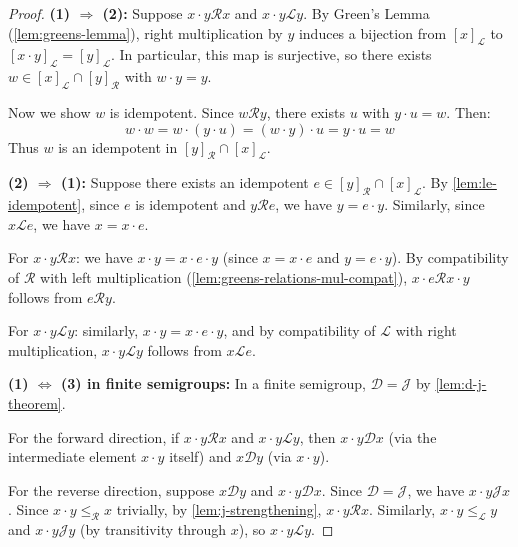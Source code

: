 \begin{proof}
\leanok
\textbf{(1) $\Rightarrow$ (2):} Suppose $x \cdot y \mathcal{R} x$ and $x \cdot y \mathcal{L} y$. By Green's Lemma (\ref{lem:greens-lemma}), right multiplication by $y$ induces a bijection from $[x]_{\mathcal{L}}$ to $[x \cdot y]_{\mathcal{L}} = [y]_{\mathcal{L}}$. In particular, this map is surjective, so there exists $w \in [x]_{\mathcal{L}} \cap [y]_{\mathcal{R}}$ with $w \cdot y = y$.

Now we show $w$ is idempotent. Since $w \mathcal{R} y$, there exists $u$ with $y \cdot u = w$. Then:
\[
w \cdot w = w \cdot (y \cdot u) = (w \cdot y) \cdot u = y \cdot u = w
\]
Thus $w$ is an idempotent in $[y]_{\mathcal{R}} \cap [x]_{\mathcal{L}}$.

\textbf{(2) $\Rightarrow$ (1):} Suppose there exists an idempotent $e \in [y]_{\mathcal{R}} \cap [x]_{\mathcal{L}}$. By \ref{lem:le-idempotent}, since $e$ is idempotent and $y \mathcal{R} e$, we have $y = e \cdot y$. Similarly, since $x \mathcal{L} e$, we have $x = x \cdot e$.

For $x \cdot y \mathcal{R} x$: we have $x \cdot y = x \cdot e \cdot y$ (since $x = x \cdot e$ and $y = e \cdot y$). By compatibility of $\mathcal{R}$ with left multiplication (\ref{lem:greens-relations-mul-compat}), $x \cdot e \mathcal{R} x \cdot y$ follows from $e \mathcal{R} y$.

For $x \cdot y \mathcal{L} y$: similarly, $x \cdot y = x \cdot e \cdot y$, and by compatibility of $\mathcal{L}$ with right multiplication, $x \cdot y \mathcal{L} y$ follows from $x \mathcal{L} e$.

\textbf{(1) $\Leftrightarrow$ (3) in finite semigroups:} In a finite semigroup, $\mathcal{D} = \mathcal{J}$ by \ref{lem:d-j-theorem}.

For the forward direction, if $x \cdot y \mathcal{R} x$ and $x \cdot y \mathcal{L} y$, then $x \cdot y \mathcal{D} x$ (via the intermediate element $x \cdot y$ itself) and $x \mathcal{D} y$ (via $x \cdot y$).

For the reverse direction, suppose $x \mathcal{D} y$ and $x \cdot y \mathcal{D} x$. Since $\mathcal{D} = \mathcal{J}$, we have $x \cdot y \mathcal{J} x$. Since $x \cdot y \leq_{\mathcal{R}} x$ trivially, by \ref{lem:j-strengthening}, $x \cdot y \mathcal{R} x$. Similarly, $x \cdot y \leq_{\mathcal{L}} y$ and $x \cdot y \mathcal{J} y$ (by transitivity through $x$), so $x \cdot y \mathcal{L} y$.
\end{proof}

